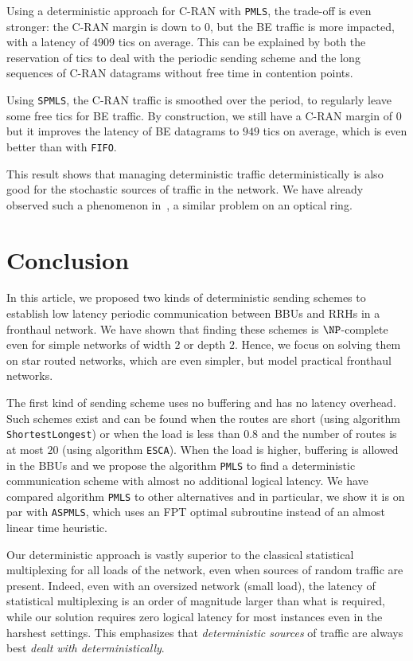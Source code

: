 \documentclass[a4paper,10pt]{journal}
\newcommand\shortestlongest{\texttt{ShortestLongest}\xspace}
\newcommand\ESCA{\texttt{ESCA}\xspace}
\newcommand\PMLS{\texttt{PMLS}\xspace}
\newcommand\ASPMLS{\texttt{ASPMLS}\xspace}
\newcommand\SPMLS{\texttt{SPMLS}\xspace}
\newcommand\FIFO{\texttt{FIFO}\xspace}
\begin{document}
     Using a deterministic approach for C-RAN with \PMLS, the trade-off is even stronger:
      the C-RAN margin is down to $0$, but the BE traffic is more impacted, with a latency of $4909$ tics on average. This can be explained by both the reservation of tics to deal with the periodic sending scheme and the long sequences of C-RAN datagrams without free time in contention points.
     
     Using \SPMLS, the C-RAN traffic is smoothed over the period, to regularly leave some free tics for BE traffic. By construction, we still have a C-RAN margin of $0$ but it improves the latency of BE datagrams to $949$ tics on average, which is even better than with \FIFO. 
     
      This result shows that managing deterministic traffic deterministically is also good for the stochastic sources of traffic in the network. We have already observed such a phenomenon in~\cite{DBLP:conf/ondm/BarthGS19}, a similar problem on an optical ring.
     


 \section{Conclusion}
 
In this article, we proposed two kinds of deterministic sending schemes to establish low latency periodic communication between BBUs and RRHs in a fronthaul network. We have shown
that finding these schemes is $\NP$-complete even for simple networks of width $2$ or depth $2$. Hence, we focus on solving them on star routed networks, which are even simpler,
but model practical fronthaul networks.

The first kind of sending scheme uses no buffering and has no latency overhead. Such schemes exist and can be found when the routes are short (using algorithm \shortestlongest) or when the load is less than $0.8$ and the number of routes is at most $20$ (using algorithm \ESCA).
When the load is higher, buffering is allowed in the BBUs and we propose the algorithm \PMLS to find a deterministic communication scheme with almost no additional logical latency.
We have compared algorithm \PMLS to other alternatives and in particular, we show it is on par with \ASPMLS, which uses an FPT optimal subroutine instead of an almost linear time heuristic.

Our deterministic approach is vastly superior to the classical statistical multiplexing for all loads of the network, even when sources of random traffic are present. Indeed, even with an oversized network (small load), the latency of statistical multiplexing is an order of magnitude larger than what is required, while our solution requires zero logical latency for most instances even in the harshest settings. This emphasizes that \emph{deterministic sources} of traffic are always best \emph{dealt with deterministically}.
\end{document}
